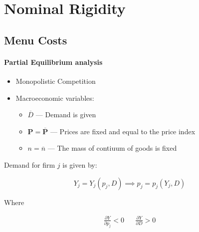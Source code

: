 \section{Nominal Rigidity}


\subsection{Menu Costs}




       
       
\paragraph{Partial Equilibrium analysis}
\begin{itemize}
    \item Monopolistic Competition
    \item Macroeconomic variables:
        \begin{itemize}
        \item $\overline{D}$ --- Demand is given
            \item $\mathbf{P} = \mathbf{\overline{P}}$ --- Prices are fixed and equal to the price index
            \item $n = \overline{n}$ --- The mass of contiuum of goods is fixed
        \end{itemize}
\end{itemize}

Demand for firm $j$ is given by:

$$
Y_j = Y_j\left(p_j ,D  \right) \implies p_j = p_j \left( Y_j, D  \right)
$$

Where 

\begin{align*}
    \frac{\partial Y}{\partial p_j} < 0 && \frac{\partial Y}{\partial D} > 0
\end{align*}

